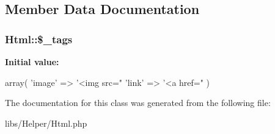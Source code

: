 \subsection{Member Data Documentation}
\hypertarget{classHtml_ae391dd5f6e8e263626f8ebdfd56e7e88}{
\subsubsection[{\$\_\-tags}]{\setlength{\rightskip}{0pt plus 5cm}Html::\$\_\-tags}}
\label{classHtml_ae391dd5f6e8e263626f8ebdfd56e7e88}
{\bfseries Initial value:}
\begin{DoxyCode}
 array(
                        'image' => '<img src="%
                        'link' => '<a href="%
                )
\end{DoxyCode}


The documentation for this class was generated from the following file:\begin{DoxyCompactItemize}
\item 
libs/Helper/Html.php\end{DoxyCompactItemize}
